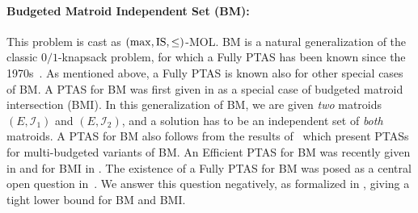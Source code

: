 \documentclass[11pt,letter]{article}
\newcommand{\IS}{\textnormal{IS}}
\newcommand{\cI}{{\mathcal{I}}}
\newcommand{\eps}{{\varepsilon}}
\begin{document}
\paragraph{Budgeted Matroid Independent Set (BM):} 

This problem is cast as $(\max,\IS,\leq)$-MOL. BM is a natural generalization of the classic $0/1${\sc-knapsack} problem, for which a Fully PTAS has been known since the 1970s~\cite{La79}. As mentioned above, a Fully PTAS is known also for other special cases of BM. A PTAS for BM was first given in \cite{BBGS11} as a special case of {\sc budgeted matroid intersection (BMI)}. In this generalization of BM, we are given {\em two} matroids $(E,\cI_1)$ and $(E,\cI_2)$, and a solution has to be an independent set of {\em both} matroids. A PTAS for BM also follows from 
the results of~\cite{GZ10,CVZ11} which present PTASs for multi-budgeted variants of BM. An Efficient PTAS for BM was recently given in \cite{DKS23} and for BMI in \cite{DKS23b}. The existence of a Fully PTAS for BM was posed as a central open question in~\cite{BBGS11,DKS23,DKS23b}. We answer this question negatively, as formalized in , giving a tight lower bound for BM and BMI. %




\end{document}

